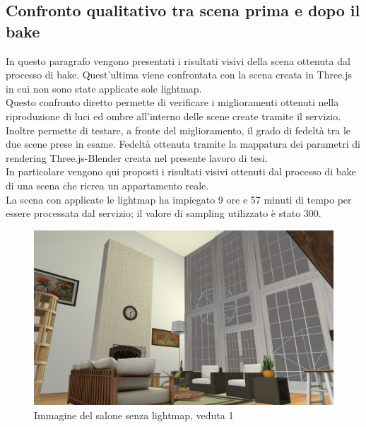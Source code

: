 \subsection{Confronto qualitativo tra scena prima e dopo il bake}
In questo paragrafo vengono presentati i risultati visivi della scena ottenuta dal processo di bake. Quest’ultima viene confrontata con la scena creata in Three.js in cui non sono state applicate sole lightmap.
\\
Questo confronto diretto permette di verificare i miglioramenti ottenuti nella riproduzione di luci ed ombre all’interno delle scene create tramite il servizio.
\\
Inoltre permette di testare, a fronte del miglioramento, il grado di fedeltà tra le due scene prese in esame. Fedeltà ottenuta tramite la mappatura dei parametri di rendering Three.js-Blender creata nel presente lavoro di tesi.
\\
In particolare vengono qui proposti i risultati visivi ottenuti dal processo di bake di una scena che ricrea un appartamento reale.
\\
La scena con applicate le lightmap ha impiegato 9 ore e 57 minuti di tempo per essere processata dal servizio; il valore di sampling utilizzato è stato 300.
\begin{figure}[htb]
 \centering
 \includegraphics[width=1\linewidth]{images/chapter_prove_sperimentali/salone_vetrata_nobake.png}\hfill
 \caption[Salone senza lightmap, veduta 1]{Immagine del salone senza lightmap, veduta 1}
 \label{fig:prove_sperimentali_navigatore_vetrata_nobake}
\end{figure}
